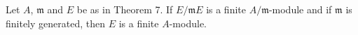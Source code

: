 Let $A$, $\mathfrak{m}$ and $E$ be as in Theorem 7. If $E/\mathfrak{m}E$ is a finite $A/\mathfrak{m}$-module and if $\mathfrak{m}$ is finitely generated, then $E$ is a finite $A$-module.